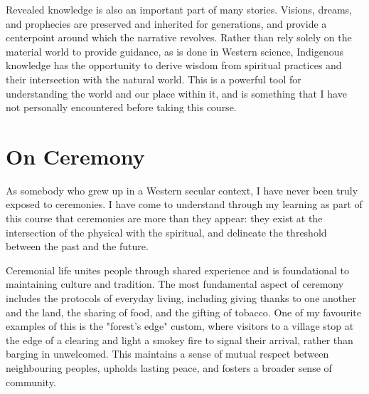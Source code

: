 \documentclass{report}
\begin{document}
\hspace{24pt} Revealed knowledge is also an important part of many stories. Visions, dreams, and prophecies are preserved and inherited for generations, and provide a centerpoint around which the narrative revolves. Rather than rely solely on the material world to provide guidance, as is done in Western science, Indigenous knowledge has the opportunity to derive wisdom from spiritual practices and their intersection with the natural world. This is a powerful tool for understanding the world and our place within it, and is something that I have not personally encountered before taking this course.








\section{On Ceremony}

\hspace{24pt} As somebody who grew up in a Western secular context, I have never been truly exposed to ceremonies. I have come to understand through my learning as part of this course that ceremonies are more than they appear: they exist at the intersection of the physical with the spiritual, and delineate the threshold between the past and the future.

\hspace{24pt} Ceremonial life unites people through shared experience and is foundational to maintaining culture and tradition. The most fundamental aspect of ceremony includes the protocols of everyday living, including giving thanks to one another and the land, the sharing of food, and the gifting of tobacco. One of my favourite examples of this is the "forest's edge" custom, where visitors to a village stop at the edge of a clearing and light a smokey fire to signal their arrival, rather than barging in unwelcomed. This maintains a sense of mutual respect between neighbouring peoples, upholds lasting peace, and fosters a broader sense of community.
\end{document}
